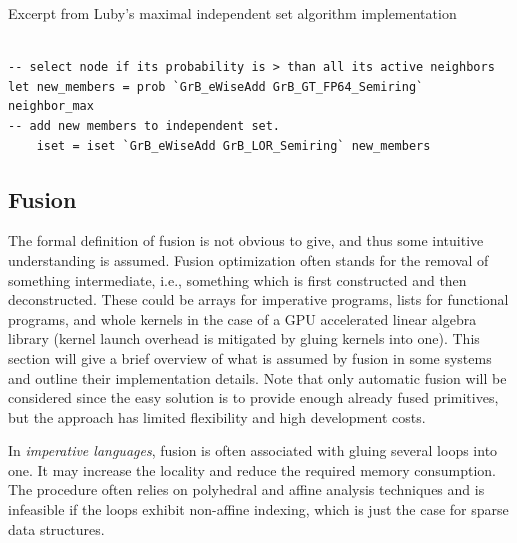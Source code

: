 \begin{listing}
\centering
\caption{Excerpt from Luby’s maximal independent set algorithm implementation}
\label{listing:fusion}
\begin{verbatim}

-- select node if its probability is > than all its active neighbors
let new_members = prob `GrB_eWiseAdd GrB_GT_FP64_Semiring` neighbor_max
-- add new members to independent set.
    iset = iset `GrB_eWiseAdd GrB_LOR_Semiring` new_members

\end{verbatim}



\end{listing}

\subsection{Fusion}

The formal definition of fusion is not obvious to give, and thus some intuitive understanding is assumed. Fusion optimization often stands for the removal of something intermediate, i.e., something which is first constructed and then deconstructed. These could be arrays for imperative programs, lists for functional programs, and whole kernels in the case of a GPU accelerated linear algebra library (kernel launch overhead is mitigated by gluing kernels into one). This section will give a brief overview of what is assumed by fusion in some systems and outline their implementation details. Note that only automatic fusion will be considered since the easy solution is to provide enough already fused primitives, but the approach has limited flexibility and high development costs.


In \textit{imperative languages}, fusion is often associated with gluing several loops into one. It may increase the locality and reduce the required memory consumption. The procedure often relies on polyhedral and affine analysis techniques and is infeasible if the loops exhibit non-affine indexing, which is just the case for sparse data structures. 

